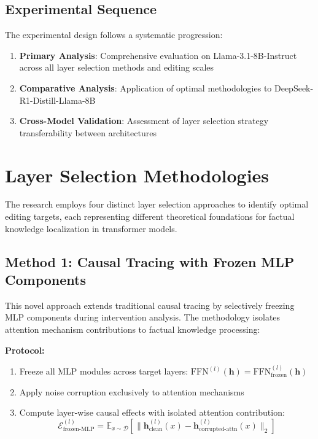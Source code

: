 \subsection{Experimental Sequence}

The experimental design follows a systematic progression:
\begin{enumerate}
    \item \textbf{Primary Analysis}: Comprehensive evaluation on Llama-3.1-8B-Instruct across all layer selection methods and editing scales
    \item \textbf{Comparative Analysis}: Application of optimal methodologies to DeepSeek-R1-Distill-Llama-8B
    \item \textbf{Cross-Model Validation}: Assessment of layer selection strategy transferability between architectures
\end{enumerate}

\section{Layer Selection Methodologies}

The research employs four distinct layer selection approaches to identify optimal editing targets, each representing different theoretical foundations for factual knowledge localization in transformer models.

\subsection{Method 1: Causal Tracing with Frozen MLP Components}

This novel approach extends traditional causal tracing by selectively freezing MLP components during intervention analysis. The methodology isolates attention mechanism contributions to factual knowledge processing:

\textbf{Protocol:}
\begin{enumerate}
    \item Freeze all MLP modules across target layers: $\text{FFN}^{(l)}(\mathbf{h}) = \text{FFN}_{\text{frozen}}^{(l)}(\mathbf{h})$
    \item Apply noise corruption exclusively to attention mechanisms
    \item Compute layer-wise causal effects with isolated attention contribution:
    \begin{equation}
    \mathcal{E}_{\text{frozen-MLP}}^{(l)} = \mathbb{E}_{x \sim \mathcal{D}} \left[ \| \mathbf{h}_{\text{clean}}^{(l)}(x) - \mathbf{h}_{\text{corrupted-attn}}^{(l)}(x) \|_2 \right]
    \end{equation}
\end{enumerate}

